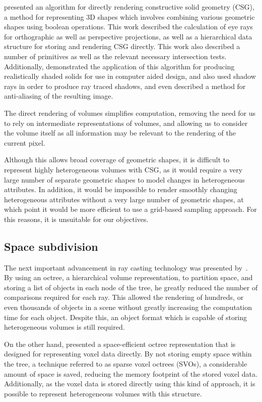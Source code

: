 \cite{roth82roughimprove} presented an algorithm for directly rendering constructive solid geometry (CSG), a method for representing 3D shapes which involves combining various geometric shapes using boolean operations. This work described the calculation of eye rays for orthographic as well as perspective projections, as well as a hierarchical data structure for storing and rendering CSG directly. This work also described a number of primitives as well as the relevant necessary intersection tests. Additionally, \citeauthor{roth82roughimprove} demonstrated the application of this algorithm for producing realistically shaded solids for use in computer aided design, and also used shadow rays in order to produce ray traced shadows, and even described a method for anti-aliasing of the resulting image.

The direct rendering of volumes simplifies computation, removing the need for us to rely on intermediate representations of volumes, and allowing us to consider the volume itself as all information may be relevant to the rendering of the current pixel.

Although this allows broad coverage of geometric shapes, it is difficult to represent highly heterogeneous volumes with CSG, as it would require a very large number of separate geometric shapes to model changes in heterogeneous attributes. In addition, it would be impossible to render smoothly changing heterogeneous attributes without a very large number of geometric shapes, at which point it would be more efficient to use a grid-based sampling approach. For this reasons, it is unsuitable for our objectives.

\subsection{Space subdivision}
The next important advancement in ray casting technology was presented by~\cite{glassner84space}. By using an octree, a hierarchical volume representation, to partition space, and storing a list of objects in each node of the tree, he greatly reduced the number of comparisons required for each ray. This allowed the rendering of hundreds, or even thousands of objects in a scene without greatly increasing the computation time for each object. Despite this, an object format which is capable of storing heterogeneous volumes is still required.

On the other hand, \cite{wilhelms00octreesfor} presented a space-efficient octree representation that is designed for representing voxel data directly. By not storing empty space within the tree, a technique referred to as sparse voxel octrees (SVOs), a considerable amount of space is saved, reducing the memory footprint of the stored voxel data. Additionally, as the voxel data is stored directly using this kind of approach, it is possible to represent heterogeneous volumes with this structure.

